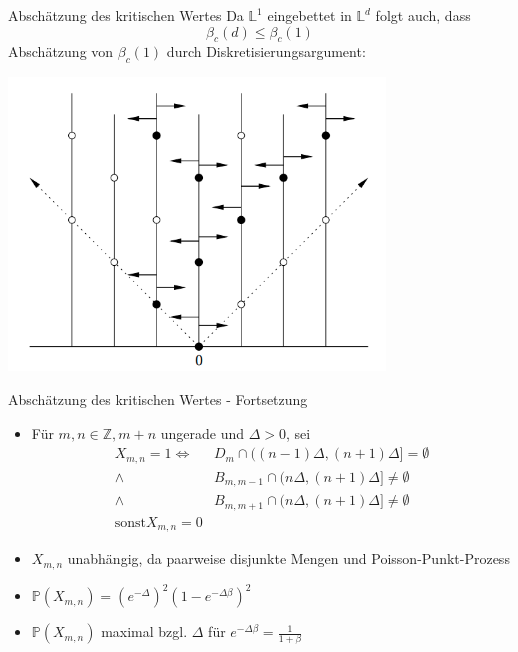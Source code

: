 \documentclass[11pt]{beamer}
\begin{document}
\begin{frame}{Absch\"atzung des kritischen Wertes}
    Da $\mathbb{L}^1$ eingebettet in $\mathbb{L}^d$ folgt auch, dass 
    \begin{equation*}
        \beta_c(d) \leq \beta_c(1)
    \end{equation*}
    Absch\"atzung von $\beta_c(1)$ durch Diskretisierungsargument:
    \begin{center}
        \includegraphics[width=0.75\textwidth]{images/contact process discretization.png}
    \end{center}
\end{frame}
\begin{frame}{Absch\"atzung des kritischen Wertes - Fortsetzung}
    \begin{itemize}
        \item F\"ur $m, n \in \mathbb{Z}, m + n$ ungerade und $\Delta > 0$, sei
            \begin{align*}
            X_{m, n} = 1 \iff &D_m \cap ((n - 1)\Delta, (n + 1)\Delta] = \emptyset\\
                \wedge &B_{m, m - 1} \cap (n\Delta, (n + 1)\Delta] \not = \emptyset\\
                \wedge &B_{m, m + 1} \cap (n\Delta, (n + 1)\Delta] \not = \emptyset\\
                \text{sonst} X_{m, n} = 0
            \end{align*}
        \item $X_{m, n}$ unabh\"angig, da paarweise disjunkte Mengen und Poisson-Punkt-Prozess
        \item $\mathbb{P}(X_{m, n}) = (e^{-\Delta})^2 (1 - e^{-\Delta \beta})^2$
        \item $\mathbb{P}(X_{m, n})$ maximal bzgl. $\Delta$ f\"ur $e^{-\Delta \beta} = \frac{1}{1 + \beta}$
    \end{itemize}
\end{frame}
\end{document}

